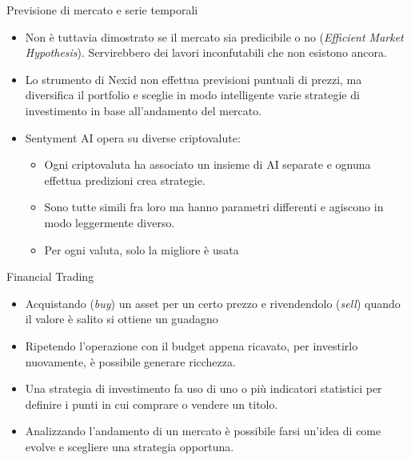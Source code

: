 \documentclass{beamer}
\begin{document}
\begin{frame}{Previsione di mercato e serie temporali}
\begin{itemize}
\item Non è tuttavia dimostrato se il mercato sia predicibile o no (\textit{Efficient Market Hypothesis}).
Servirebbero dei lavori inconfutabili che non esistono ancora.
\item Lo strumento di Nexid non effettua previsioni puntuali di prezzi, ma diversifica il portfolio e sceglie in modo intelligente varie strategie di investimento in base all'andamento del mercato.
\item Sentyment AI opera su diverse criptovalute:
\begin{itemize}
    \item Ogni criptovaluta ha associato un insieme di AI separate e ognuna effettua predizioni crea strategie. \item Sono tutte simili fra loro ma hanno parametri differenti e agiscono in modo leggermente diverso.
    \item Per ogni valuta, solo la migliore è usata
\end{itemize}
\end{itemize}
\end{frame}

\begin{frame}{Financial Trading}
\begin{itemize}
    \item Acquistando (\textit{buy}) un asset per un certo prezzo e rivendendolo (\textit{sell}) quando il valore è salito si ottiene un guadagno
    \item Ripetendo l'operazione con il budget appena ricavato, per investirlo nuovamente, è possibile generare ricchezza. 
    \item Una strategia di investimento fa uso di uno o più indicatori statistici per definire i punti in cui comprare o vendere un titolo.
    \item Analizzando l'andamento di un mercato è possibile farsi un'idea di come evolve e scegliere una strategia opportuna.
    \begin{figure}
\end{figure}
\end{itemize}
\end{frame}
\end{document}

